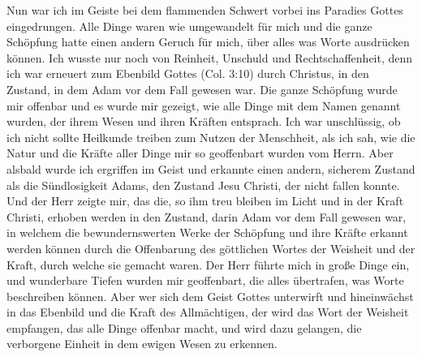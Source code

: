 Nun war ich im Geiste bei dem flammenden Schwert vorbei
ins Paradies Gottes eingedrungen. Alle Dinge waren wie 
umgewandelt für mich und die ganze Schöpfung hatte einen andern
Geruch für mich, über alles was Worte ausdrücken können. Ich
wusste nur noch von Reinheit, Unschuld und Rechtschaffenheit, denn
ich war erneuert zum Ebenbild Gottes 
(Col. 3:10) durch Christus,
in den Zustand, in dem Adam vor dem Fall gewesen 
war. Die
ganze Schöpfung wurde mir offenbar und es wurde mir gezeigt,
wie alle Dinge mit dem Namen genannt wurden, der ihrem
Wesen und ihren Kräften entsprach. Ich war unschlüssig, ob ich
nicht sollte Heilkunde treiben zum Nutzen 
der Menschheit, als ich
sah, wie die Natur und die Kräfte aller Dinge mir so geoffenbart
wurden vom Herrn. Aber alsbald wurde ich ergriffen im Geist
und erkannte einen andern, sicherem Zustand als die Sündlosigkeit 
Adams, den Zustand Jesu Christi, der nicht fallen konnte.
Und der Herr zeigte mir, das die, so ihm treu bleiben im Licht
und in der Kraft Christi, erhoben werden in den Zustand, darin
Adam vor dem Fall gewesen war, in welchem die bewundernswerten 
Werke der Schöpfung und ihre Kräfte erkannt werden
können durch die Offenbarung des göttlichen Wortes der 
Weisheit und der Kraft, durch welche sie gemacht waren. Der Herr
führte mich in große Dinge ein, und wunderbare Tiefen wurden
mir geoffenbart, die alles übertrafen, was Worte beschreiben
können. Aber wer sich dem Geist Gottes unterwirft und 
hineinwächst in das Ebenbild und die Kraft des Allmächtigen, der wird
das Wort der Weisheit empfangen, das alle Dinge offenbar macht,
und wird dazu gelangen, die verborgene Einheit in dem ewigen
Wesen zu erkennen.

